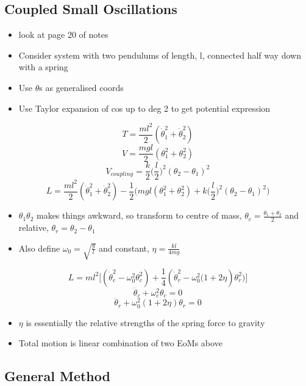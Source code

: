\documentclass[a4paper,11pt,normalem]{article}
\begin{document}
\subsection{Coupled Small Oscillations}\label{coupled-small-oscillations}

\begin{itemize}
\item
  look at page 20 of notes
\item
  Consider system with two pendulums of length, l, connected half way
  down with a spring
\item
  Use \(\theta\)s as generalised coords
\item
  Use Taylor expansion of cos up to deg 2 to get potential expression
\end{itemize}

\[
    T = \frac{ml^2}{2}(\dot{\theta}_{1}^{2} + \dot{\theta}_{2}^{2}) \]
\[
    V = \frac{mgl}{2}(\theta_{1}^2 + \theta_{2}^2) \] \[
    V_{coupling} = \frac{k}{2}\Big(\frac{l}{2}\Big)^2 (\theta_2 - \theta_1)^2 \]
\[
    L = \frac{ml^2}{2}(\dot{\theta}_{1}^{2} + \dot{\theta}_{2}^{2}) - \frac{1}{2}\Bigg(mgl(\theta_{1}^2 + \theta_{2}^2) + k\Big(\frac{l}{2}\Big)^2 (\theta_2 - \theta_1)^2 \Bigg)
\]

\begin{itemize}
\item
  \(\theta_1 \theta_2\) makes things awkward, so transform to centre of
  mass, \(\theta_c = \frac{\theta_1 + \theta_2}{2}\) and relative,
  \(\theta_r = \theta_2 - \theta_1\)
\item
  Also define \(\omega_0 = \sqrt{\frac{g}{l}}\) and constant,
  \(\eta = \frac{kl}{4mg}\)
\end{itemize}

\[
    L = ml^2 \Bigg[(\dot{\theta}_{c}^2 - \omega_{0}^2\theta_{c}^2) + \frac{1}{4}(\dot{\theta}_{r}^2 - \omega_{0}^2 \Big(1 + 2\eta)\theta_{r}^2\Big) \Bigg] \]
\[
    \ddot{\theta}_{c} + \omega_{c}^2 \theta_{c} = 0 \] \[
    \ddot{\theta}_{r} + \omega_{0}^2 (1 + 2\eta)\theta_r = 0
\]

\begin{itemize}
\item
  \(\eta\) is essentially the relative strengths of the spring force to
  gravity
\item
  Total motion is linear combination of two EoMs above
\end{itemize}

\subsection{General Method}\label{general-method}
\end{document}
